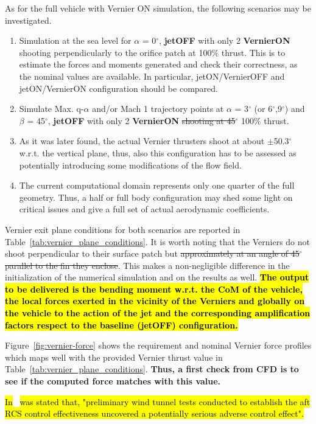 \documentclass[12pt]{article}
\begin{document}
As for the full vehicle with Vernier ON simulation, the following scenarios may be investigated.

\begin{enumerate}
    \item Simulation at the sea level for $\alpha$ = 0$^\circ$, \textbf{jetOFF} with only 2 \textbf{VernierON} shooting perpendicularly to the orifice patch at 100\% thrust. This is to estimate the forces and moments generated and check their correctness, as the nominal values are available. In particular, jetON/VernierOFF and jetON/VernierON configuration should be compared.
    \item Simulate Max. q-$\alpha$ and/or Mach 1 trajectory points at $\alpha$ = 3$^\circ$ (or 6$^\circ$,9$^\circ$) and $\beta$ = 45$^\circ$,  \textbf{jetOFF} with only 2 \textbf{VernierON} \st{shooting at 45$^\circ$} 100\% thrust. 
    \item As it was later found, the actual Vernier thrusters shoot at about $\pm$50.3$^\circ$ w.r.t. the vertical plane, thus, also this configuration has to be assessed as potentially introducing some modifications of the flow field.
    \item The current computational domain represents only one quarter of the full geometry. Thus, a half or full body configuration may shed some light on critical issues and give a full set of actual aerodynamic coefficients.
\end{enumerate}
%
Vernier exit plane conditions for both scenarios are reported in Table~\ref{tab:vernier_plane_conditions}. It is worth noting that the Verniers do not shoot perpendicular to their surface patch but \st{approximately at an angle of 45$^\circ$ parallel to the fin they enclose}. This makes a non-negligible difference in the initialization of the numerical simulation and on the results as well. \hl{\textbf{The output to be delivered is the bending moment w.r.t. the CoM of the vehicle, the local forces exerted in the vicinity of the Verniers and globally on the vehicle to the action of the jet and the corresponding amplification factors respect to the baseline (jetOFF) configuration.}}

Figure~\ref{fig:vernier-force} shows the requirement and nominal Vernier force profiles which maps well with the provided Vernier thrust value in Table~\ref{tab:vernier_plane_conditions}. \textbf{Thus, a first check from CFD is to see if the computed force matches with this value.}

\hl{In}~\cite{rausch1973rcs} \hl{was stated that, "preliminary wind tunnel tests conducted to establish the aft RCS control effectiveness uncovered a potentially serious adverse control effect".}
\end{document}
